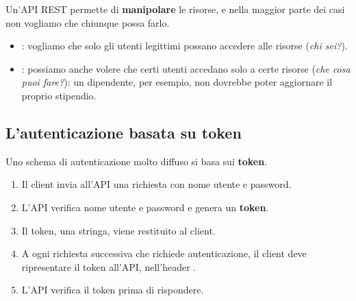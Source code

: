 Un'API REST permette di \textbf{manipolare} le risorse, e nella maggior parte dei casi non vogliamo che chiunque possa
farlo.
\begin{itemize}
  \item {}: vogliamo che solo gli utenti legittimi possano accedere alle risorse (\textit{chi sei?}).
  \item {}: possiamo anche volere che certi utenti accedano solo a certe risorse
        (\textit{che cosa puoi fare?}): un dipendente, per esempio, non dovrebbe poter aggiornare il proprio stipendio.
\end{itemize}

\subsection{L'autenticazione basata su token}

Uno schema di autenticazione molto diffuso si basa sui \textbf{token}.
\begin{enumerate}
  \item Il client invia all'API una richiesta con nome utente e password.
  \item L'API verifica nome utente e password e genera un \textbf{token}.
  \item Il token, una stringa, viene restituito al client.
  \item A ogni richiesta successiva che richiede autenticazione, il client deve ripresentare il token all'API,
        nell'header .
  \item L'API verifica il token prima di rispondere.
\end{enumerate}

